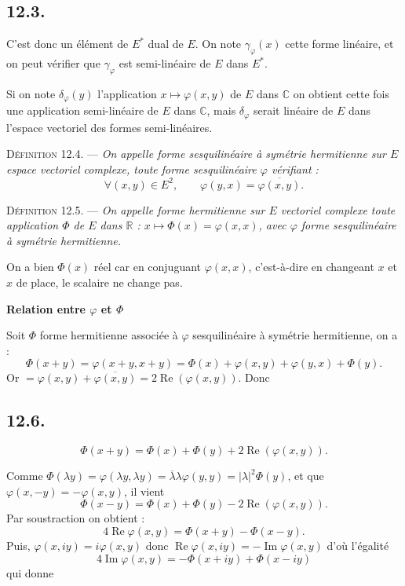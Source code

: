 \subsection*{12.3.}
C'est donc un élément de $E^*$ dual de $E$. On note $\gamma_\varphi(x)$ cette forme linéaire, et on peut vérifier que $\gamma_\varphi$ est semi-linéaire de $E$ dans $E^*$.

Si on note $\delta_\varphi(y)$ l'application $x\longmapsto\varphi(x,y)$ de $E$ dans $\mathbb C$ on obtient cette fois une application semi-linéaire de $E$ dans $\mathbb C$, mais $\delta_\varphi$ serait linéaire de $E$ dans l'espace vectoriel des formes semi-linéaires.

\medskip\noindent\textsc{Définition 12.4.} --- \emph{On appelle forme sesquilinéaire à symétrie hermitienne sur $E$ espace vectoriel complexe, toute forme sesquilinéaire $\varphi$ vérifiant :
\[
\forall(x,y)\in E^2,\qquad \varphi(y,x)=\overline{\varphi(x,y)}.
\]}

\medskip\noindent\textsc{Définition 12.5.} --- \emph{On appelle forme hermitienne sur $E$ vectoriel complexe toute application $\Phi$ de $E$ dans $\mathbb R$ : $x\longmapsto\Phi(x)=\varphi(x,x)$, avec $\varphi$ forme sesquilinéaire à symétrie hermitienne.}

On a bien $\Phi(x)$ réel car en conjuguant $\varphi(x,x)$, c'est-à-dire en changeant $x$ et $x$ de place, le scalaire ne change pas.

\medskip\noindent\textbf{Relation entre $\varphi$ et $\Phi$}

Soit $\Phi$ forme hermitienne associée à $\varphi$ sesquilinéaire à symétrie hermitienne, on a :
\[
\Phi(x+y)=\varphi(x+y,x+y)=\Phi(x)+\varphi(x,y)+\varphi(y,x)+\Phi(y).
\]
Or  $=\varphi(x,y)+\overline{\varphi(x,y)}=2\operatorname{Re}(\varphi(x,y))$. Donc

\subsection*{12.6.}
\[
\Phi(x+y)=\Phi(x)+\Phi(y)+2\operatorname{Re}(\varphi(x,y)).
\]

Comme $\Phi(\lambda y)=\varphi(\lambda y,\lambda y)=\overline\lambda\lambda\varphi(y,y)=|\lambda|^2\Phi(y)$, et que $\varphi(x,-y)=-\varphi(x,y)$, il vient
\[
\Phi(x-y)=\Phi(x)+\Phi(y)-2\operatorname{Re}(\varphi(x,y)).
\]
Par soustraction on obtient :
\[
4\operatorname{Re}\varphi(x,y)=\Phi(x+y)-\Phi(x-y).
\]
Puis, $\varphi(x,iy)=i\varphi(x,y)$ donc $\operatorname{Re}\varphi(x,iy)=-\operatorname{Im}\varphi(x,y)$ d'où l'égalité
\[
4\operatorname{Im}\varphi(x,y)=-\Phi(x+iy)+\Phi(x-iy)
\]
qui donne

